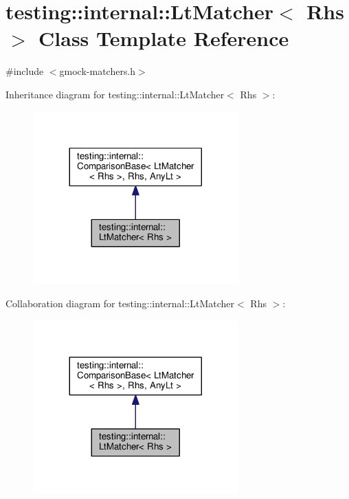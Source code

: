 \hypertarget{classtesting_1_1internal_1_1LtMatcher}{}\section{testing\+:\+:internal\+:\+:Lt\+Matcher$<$ Rhs $>$ Class Template Reference}
\label{classtesting_1_1internal_1_1LtMatcher}


{\ttfamily \#include $<$gmock-\/matchers.\+h$>$}



Inheritance diagram for testing\+:\+:internal\+:\+:Lt\+Matcher$<$ Rhs $>$\+:\nopagebreak
\begin{figure}[H]
\begin{center}
\leavevmode
\includegraphics[width=224pt]{classtesting_1_1internal_1_1LtMatcher__inherit__graph}
\end{center}
\end{figure}


Collaboration diagram for testing\+:\+:internal\+:\+:Lt\+Matcher$<$ Rhs $>$\+:\nopagebreak
\begin{figure}[H]
\begin{center}
\leavevmode
\includegraphics[width=224pt]{classtesting_1_1internal_1_1LtMatcher__coll__graph}
\end{center}
\end{figure}
